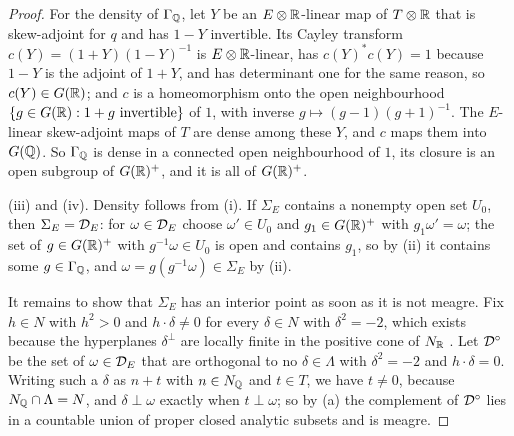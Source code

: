 \begin{proof}
For the density of $\Gamma_{\mathbb{Q}}$, let $Y$ be an $E\otimes\mathbb{R}$-linear map of
$T\otimes\mathbb{R}$ that is skew-adjoint for $q$ and has $1-Y$ invertible. Its
Cayley transform $c(Y)=(1+Y)(1-Y)^{-1}$ is $E\otimes\mathbb{R}$-linear, has
$c(Y)^{*}c(Y)=1$ because $1-Y$ is the adjoint of $1+Y$, and has determinant
one for the same reason, so $c(Y)\in G(\mathbb{R})$; and $c$ is a homeomorphism onto
the open neighbourhood $\{g\in G(\mathbb{R}):1+g\ \text{invertible}\}$ of $1$, with
inverse $g\mapsto(g-1)(g+1)^{-1}$. The $E$-linear skew-adjoint maps of $T$
are dense among these $Y$, and $c$ maps them into $G(\mathbb{Q})$. So $\Gamma_{\mathbb{Q}}$
is dense in a connected open neighbourhood of $1$, its closure is an open
subgroup of $G(\mathbb{R})^{+}$, and it is all of $G(\mathbb{R})^{+}$.

(iii) and (iv). Density follows from (i). If $\Sigma_{E}$ contains a nonempty
open set $U_{0}$, then $\Sigma_{E}=\mathcal{D}_{E}$: for $\omega\in\mathcal{D}_{E}$ choose
$\omega'\in U_{0}$ and $g_{1}\in G(\mathbb{R})^{+}$ with $g_{1}\omega'=\omega$; the
set of $g\in G(\mathbb{R})^{+}$ with $g^{-1}\omega\in U_{0}$ is open and contains
$g_{1}$, so by (ii) it contains some $g\in\Gamma_{\mathbb{Q}}$, and
$\omega=g(g^{-1}\omega)\in\Sigma_{E}$ by (ii).

It remains to show that $\Sigma_{E}$ has an interior point as soon as it is
not meagre. Fix $h\in N$ with $h^{2}>0$ and $h\cdot\delta\ne0$ for every
$\delta\in N$ with $\delta^{2}=-2$, which exists because the hyperplanes
$\delta^{\perp}$ are locally finite in the positive cone of $N_{\mathbb{R}}$
\cite[Ch.~8]{Huy16}. Let $\mathcal{D}^{\circ}$ be the set of $\omega\in\mathcal{D}_{E}$ that
are orthogonal to no $\delta\in\Lambda$ with $\delta^{2}=-2$ and
$h\cdot\delta=0$. Writing such a $\delta$ as $n+t$ with $n\in N_{\mathbb{Q}}$ and
$t\in T$, we have $t\ne0$, because $N_{\mathbb{Q}}\cap\Lambda=N$, and
$\delta\perp\omega$ exactly when $t\perp\omega$; so by (a) the complement of
$\mathcal{D}^{\circ}$ lies in a countable union of proper closed analytic subsets and
is meagre.


\end{proof}
